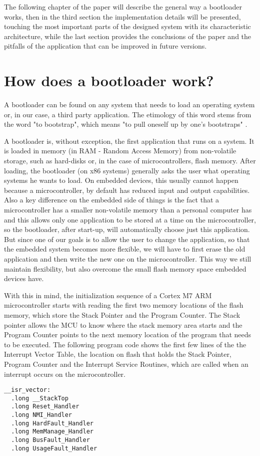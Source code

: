 \documentclass[10pt,a4paper,twoside]{article}
\begin{document}
The following chapter of the paper will describe the general way a bootloader works, then in the third section the implementation details will be presented, touching the most important parts of the designed system with its characteristic architecture, while the last section provides the conclusions of the paper and the pitfalls of the application that can be improved in future versions.

\section{How does a bootloader work?}
A bootloader can be found on any system that needs to load an operating system or, in our case, a third party application. The etimology of this word stems from the word "to bootstrap", which means "to pull oneself up by one's bootstraps" \cite{bootstrapping}.

A bootloader is, without exception, the first application that runs on a system. It is loaded in memory (in RAM - Random Access Memory) from non-volatile storage, such as hard-disks or, in the case of microcontrollers, flash memory. After loading, the bootloader (on x86 systems) generally asks the user what operating systems he wants to load. On embedded devices, this usually cannot happen because a microcontroller, by default has reduced input and output capabilities. Also a key difference on the embedded side of things is the fact that a microcontroller has a smaller non-volatile memory than a personal computer has and this allows only one application to be stored at a time on the microcontroller, so the bootloader, after start-up, will automatically choose just this application.
But since one of our goals is to allow the user to change the application, so that the embedded system becomes more flexible, we will have to first erase the old application and then write the new one on the microcontroller. This way we still maintain flexibility, but also overcome the small flash memory space embedded devices have.

With this in mind, the initialization sequence of a Cortex M7 ARM microcontroller starts with reading the first two memory locations of the flash memory, which store the Stack Pointer and the Program Counter.
The Stack pointer allows the MCU to know where the stack memory area starts and the Program Counter points to the next memory location of the program that needs to be executed.
The following program code shows the first few lines of the the Interrupt Vector Table, the location on flash that holds the Stack Pointer, Program Counter and the Interrupt Service Routines, which are called when an interrupt occurs on the microcontroller.
\begin{verbatim}
__isr_vector:
  .long __StackTop
  .long Reset_Handler
  .long NMI_Handler
  .long HardFault_Handler
  .long MemManage_Handler
  .long BusFault_Handler
  .long UsageFault_Handler
\end{verbatim}
\end{document}
